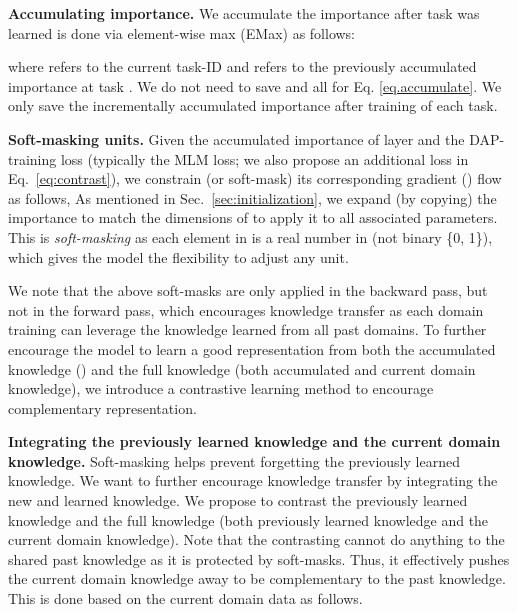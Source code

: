 \documentclass{article} \usepackage{iclr2023_conference,times}
\begin{document}
\textbf{Accumulating importance.} We accumulate the importance after task  was learned is done {\color{black}via element-wise max (EMax)} as follows: 

where  refers to the current task-ID and  refers to the previously accumulated importance at task . 
We do not need to save  and all  for Eq. \ref{eq.accumulate}. We only save the incrementally accumulated importance after training of each task. 

\textbf{Soft-masking units.} Given the accumulated importance  of layer  and the DAP-training loss  (typically the MLM loss; we also propose an additional loss in Eq.~\ref{eq:contrast}), we constrain (or soft-mask) its corresponding gradient () flow as follows, 
As mentioned in Sec.~\ref{sec:initialization}, we expand (by copying) the importance  to match the dimensions of  to apply it to all associated parameters. This is \textit{soft-masking} as each element in  is a real number in  (not binary \{0, 1\}), which gives the model the flexibility to adjust any unit. 




We note that the above soft-masks are only applied in the backward pass, but not in the forward pass, which encourages knowledge transfer as each domain training can leverage the knowledge learned from all past domains. To further encourage the model to learn a good representation from both the accumulated knowledge () and the full knowledge (both accumulated and current domain knowledge), we introduce a contrastive learning method to encourage complementary representation.




\noindent\textbf{Integrating the previously learned knowledge and the current domain knowledge.}
{\color{black}Soft-masking helps prevent forgetting the previously learned knowledge. We want to further encourage knowledge transfer by integrating the new and learned knowledge. We propose to contrast the previously learned knowledge and the full knowledge (both previously learned knowledge and the current domain knowledge). Note that the contrasting cannot do anything to the shared past knowledge as it is protected by soft-masks. Thus, it effectively pushes the current domain knowledge away to be complementary to the past knowledge. This is done based on the current domain data as follows.} 
\end{document}
